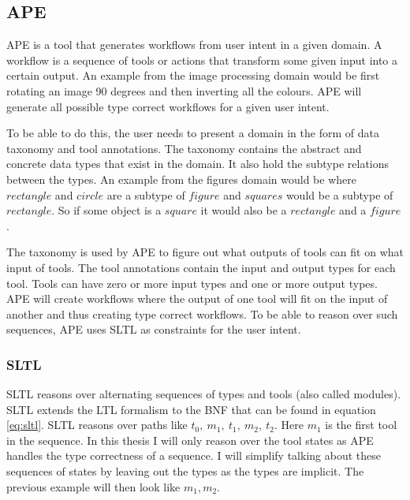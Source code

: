 \documentclass{article}
\begin{document}
\subsection{APE}
APE is a tool that generates workflows from user intent in a given domain. A workflow is a sequence of tools or actions that transform some given input into a certain output. An example from the image processing domain would be first rotating an image 90 degrees and then inverting all the colours. APE will generate all possible type correct workflows for a given user intent.

To be able to do this, the user needs to present a domain in the form of data taxonomy and tool annotations. The taxonomy contains the abstract and concrete data types that exist in the domain. It also hold the subtype relations between the types. An example from the figures domain would be where $rectangle$ and $circle$ are a subtype of $figure$ and $squares$ would be a subtype of $rectangle$. So if some object is a $square$ it would also be a $rectangle$ and a $figure$. 

The taxonomy is used by APE to figure out what outputs of tools can fit on what input of tools. The tool annotations contain the input and output types for each tool. Tools can have zero or more input types and one or more output types. APE will create workflows where the output of one tool will fit on the input of another and thus creating type correct workflows. To be able to reason over such sequences, APE uses SLTL as constraints for the user intent. 




\subsubsection{SLTL}

SLTL reasons over alternating sequences of types and tools (also called modules). SLTL extends the LTL formalism to the BNF that can be found in equation \ref{eq:sltl}. SLTL reasons over paths like $t_0,\ m_1,\ t_1,\ m_2,\ t_2$. Here $m_1$ is the first tool in the sequence. In this thesis I will only reason over the tool states as APE handles the type correctness of a sequence. I will simplify talking about these sequences of states by leaving out the types as the types are implicit. The previous example will then look like $m_1, m_2$.
\end{document}
